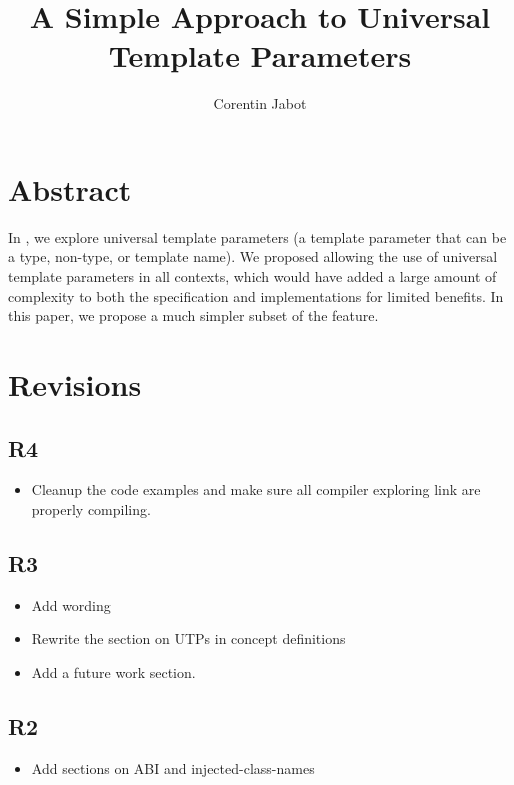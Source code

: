 \documentclass{wg21}
\title{A Simple Approach to Universal Template Parameters}
\author{Corentin Jabot}{corentin.jabot@gmail.com}
\begin{document}
\maketitle

\section{Abstract}
In , we explore universal template parameters (a template parameter that can be a type, non-type, or template name).
We proposed allowing the use of universal template parameters in all contexts, which would have added a large amount of complexity to both the specification and implementations
for limited benefits. In this paper, we propose a much simpler subset of the feature.


\section{Revisions}

\subsection{R4}

\begin{itemize}
\item Cleanup the code examples and make sure all compiler exploring link are properly compiling.
\end{itemize}

\subsection{R3}

\begin{itemize}
  \item Add wording
  \item Rewrite the section on UTPs in concept definitions
  \item Add a future work section.
\end{itemize}

\subsection{R2}

\begin{itemize}
\item Add sections on ABI and injected-class-names
\end{itemize}
\end{document}
